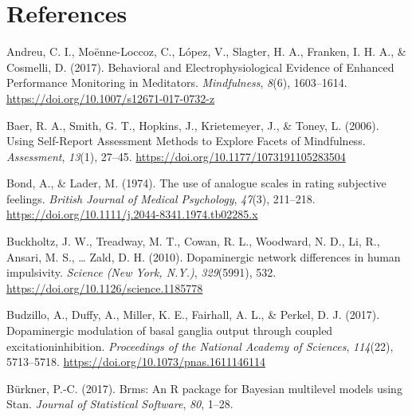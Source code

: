 \documentclass[
  man]{apa6}
\newlength{\cslhangindent}
\newlength{\cslentryspacingunit} %
\newenvironment{CSLReferences}[2] %
 {%
  \setlength{\parindent}{0pt}
  \ifodd #1
  \let\oldpar\par
  \def\par{\hangindent=\cslhangindent\oldpar}
  \fi
  \setlength{\parskip}{#2\cslentryspacingunit}
 }%
 {}
\begin{document}
\hypertarget{references}{%
\section*{References}\label{references}}

\hypertarget{refs}{}
\begin{CSLReferences}{1}{0}
\leavevmode{}%
Andreu, C. I., Moënne-Loccoz, C., López, V., Slagter, H. A., Franken, I. H. A., \& Cosmelli, D. (2017). Behavioral and {Electrophysiological Evidence} of {Enhanced Performance Monitoring} in {Meditators}. \emph{Mindfulness}, \emph{8}(6), 1603--1614. \url{https://doi.org/10.1007/s12671-017-0732-z}

\leavevmode{}%
Baer, R. A., Smith, G. T., Hopkins, J., Krietemeyer, J., \& Toney, L. (2006). Using {Self-Report Assessment Methods} to {Explore Facets} of {Mindfulness}. \emph{Assessment}, \emph{13}(1), 27--45. \url{https://doi.org/10.1177/1073191105283504}

\leavevmode{}%
Bond, A., \& Lader, M. (1974). The use of analogue scales in rating subjective feelings. \emph{British Journal of Medical Psychology}, \emph{47}(3), 211--218. \url{https://doi.org/10.1111/j.2044-8341.1974.tb02285.x}

\leavevmode{}%
Buckholtz, J. W., Treadway, M. T., Cowan, R. L., Woodward, N. D., Li, R., Ansari, M. S., \ldots{} Zald, D. H. (2010). Dopaminergic network differences in human impulsivity. \emph{Science (New York, N.Y.)}, \emph{329}(5991), 532. \url{https://doi.org/10.1126/science.1185778}

\leavevmode{}%
Budzillo, A., Duffy, A., Miller, K. E., Fairhall, A. L., \& Perkel, D. J. (2017). Dopaminergic modulation of basal ganglia output through coupled excitation{\textendash}inhibition. \emph{Proceedings of the National Academy of Sciences}, \emph{114}(22), 5713--5718. \url{https://doi.org/10.1073/pnas.1611146114}

\leavevmode{}%
Bürkner, P.-C. (2017). Brms: {An R} package for {Bayesian} multilevel models using {Stan}. \emph{Journal of Statistical Software}, \emph{80}, 1--28.


\end{CSLReferences}
\end{document}
